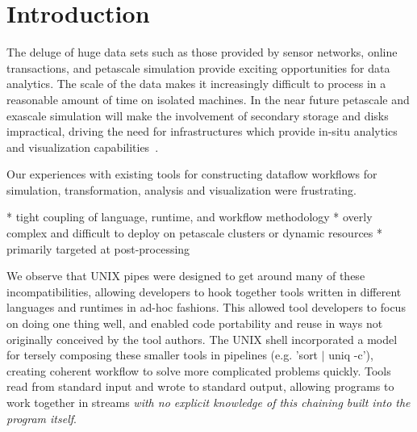 \section{Introduction}

The deluge of huge data sets such as those provided by sensor
networks, online transactions, and petascale simulation provide 
exciting opportunities for data analytics.  
The scale of the data makes it increasingly difficult to process 
in a reasonable amount of time on isolated machines.
In the near future petascale and exascale simulation will make 
the involvement of secondary storage and disks impractical, driving
the need for infrastructures which provide in-situ analytics and
visualization capabilities~\cite{ma:in-site}.

Our experiences with existing tools for constructing dataflow workflows
for simulation, transformation, analysis and visualization were frustrating.

* tight coupling of language, runtime, and workflow methodology
* overly complex and difficult to deploy on petascale clusters or 
dynamic resources
* primarily targeted at post-processing

%

We observe that UNIX pipes were designed to get around many of these
incompatibilities, allowing developers to hook together tools written
in different languages and runtimes in ad-hoc fashions.  This allowed
tool developers to focus on doing one thing well, and enabled code
portability and reuse in ways not originally conceived by the tool
authors.  The UNIX shell incorporated a model for tersely composing
these smaller tools in pipelines (e.g. 'sort $|$ uniq -c'), creating
coherent workflow to solve more complicated problems quickly.  Tools
read from standard input and wrote to standard output, allowing
programs to work together in streams \emph{with no explicit knowledge
of this chaining built into the program itself}.

